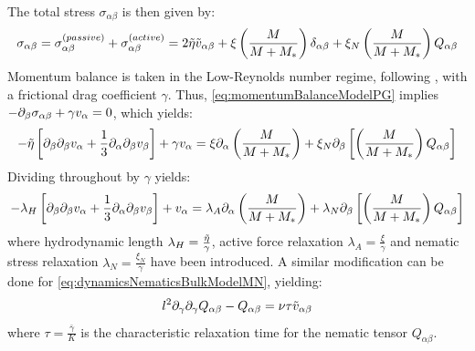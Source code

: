 The total stress $\sigma_{\alpha\beta}$ is then given by:
\begin{equation}\label{eq:totalStressBulkModelMN}
    \sigma_{\alpha\beta} = \sigma^{(passive)}_{\alpha\beta} + \sigma^{(active)}_{\alpha\beta} = 2\Tilde{\eta}\Tilde{v}_{\alpha\beta} + \xi\left(\frac{M}{M + M_*}\right)\delta_{\alpha\beta} + \xi_N \left(\frac{M}{M + M_*}\right) Q_{\alpha\beta}
\end{equation}
Momentum balance is taken in the Low-Reynolds number regime, following \cite{gross2019guiding}, with a frictional drag coefficient $\gamma$. Thus, \autoref{eq:momentumBalanceModelPG} implies $-\inlinePartial{\beta}{\sigma_{\alpha\beta}} + \gamma v_\alpha = 0$, which yields:
\begin{equation}
    -\Tilde{\eta}\left[\inlinePartial{\beta}{\inlinePartial{\beta}{v_\alpha}} + \frac{1}{3}\inlinePartial{\alpha}{\inlinePartial{\beta}{v_\beta}}\right] + \gamma v_\alpha = \xi\inlinePartial{\alpha}{\left(\frac{M}{M + M_*}\right)} + \xi_N \inlinePartial{\beta}{\left[\left(\frac{M}{M + M_*}\right) Q_{\alpha\beta}\right]}
\end{equation}
Dividing throughout by $\gamma$ yields:
\begin{equation}\label{eq:dynamicsCortexVelocityBulkModelReducedModelMN}
    -\lambda_H\left[\inlinePartial{\beta}{\inlinePartial{\beta}{v_\alpha}} + \frac{1}{3}\inlinePartial{\alpha}{\inlinePartial{\beta}{v_\beta}}\right] + v_\alpha = \lambda_A\inlinePartial{\alpha}{\left(\frac{M}{M + M_*}\right)} + \lambda_N \inlinePartial{\beta}{\left[\left(\frac{M}{M + M_*}\right) Q_{\alpha\beta}\right]}
\end{equation}
where hydrodynamic length $\lambda_H = \frac{\Tilde{\eta}}{\gamma}$, active force relaxation $\lambda_A = \frac{\xi}{\gamma}$ and nematic stress relaxation $\lambda_N = \frac{\xi_N}{\gamma}$ have been introduced. A similar modification can be done for \autoref{eq:dynamicsNematicsBulkModelMN}, yielding:
\begin{equation}\label{eq:dynamicsNematicsBulkModelReducedModelMN}
    l^2\inlinePartial{\gamma}{\inlinePartial{\gamma}{Q_{\alpha\beta}}} - Q_{\alpha\beta} = \nu\tau \Tilde{v}_{\alpha\beta}
\end{equation}
where $\tau = \frac{\bar{\gamma}}{K}$ is the characteristic relaxation time for the nematic tensor $Q_{\alpha\beta}$.

